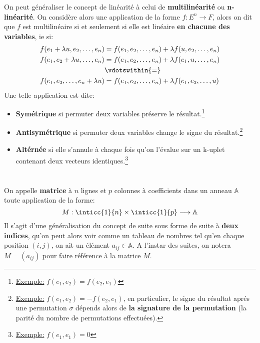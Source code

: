 On peut généraliser le concept de linéarité à celui de \textbf{multilinéarité} ou \textbf{n-linéarité}. On considère alors une application de la forme \(f : E^n \longrightarrow F\), alors on dit que \(f\) est multilinéaire si et seulement si elle est linéaire \textbf{en chacune des variables}, ie si:
\begin{align*}
   f(e_1 + \lambda u, e_2, \ldots, e_n) &= f(e_1, e_2, \ldots, e_n) + \lambda f(u, e_2, \ldots, e_n)  \\
   f(e_1, e_2  + \lambda u, \ldots, e_n) &= f(e_1, e_2, \ldots, e_n) + \lambda f(e_1, u, \ldots, e_n) \\
   & \vdotswithin{=} \\   
   f(e_1, e_2 , \ldots, e_n + \lambda u) &= f(e_1, e_2, \ldots, e_n) + \lambda f(e_1, e_2, \ldots, u)
\end{align*}
Une telle application est dite:
\begin{itemize}
   \item \textbf{Symétrique} si permuter deux variables préserve le résultat.\footnote[1]{\underline{Exemple:} \(f(e_1, e_2) = f(e_2, e_1)\)}
   \item \textbf{Antisymétrique} si permuter deux variables change le signe du résultat.\footnote[2]{\underline{Exemple:} \(f(e_1, e_2) = -f(e_2, e_1)\), en particulier, le signe du résultat aprés une permutation \(\sigma\) dépends alors de \textbf{la signature de la permutation} (la parité du nombre de permutations effectuées).}
   \item  \textbf{Altérnée} si elle s'annule à chaque fois qu'on l'évalue sur un k-uplet contenant deux vecteurs identiques.\footnote[3]{\underline{Exemple:} \(f(e_1, e_1) = 0\)}
\end{itemize}

\chapter*{} %

On appelle \textbf{matrice} à \(n\) lignes et \(p\) colonnes à coefficients dans un anneau \(\mathbb{A}\) toute application de la forme:
\[
   M : \inticc{1}{n} \times \inticc{1}{p} \longrightarrow \mathbb{A}
\]
Il s'agit d'une généralisation du concept de suite sous forme de suite à \textbf{deux indices}, qu'on peut alors voir comme un tableau de nombres tel qu'en chaque position \((i, j)\), on ait un élément \(a_{ij} \in \mathbb{A}\). A l'instar des suites, on notera \(M = (a_{ij})\) pour faire référence à la matrice \(M\).\<

